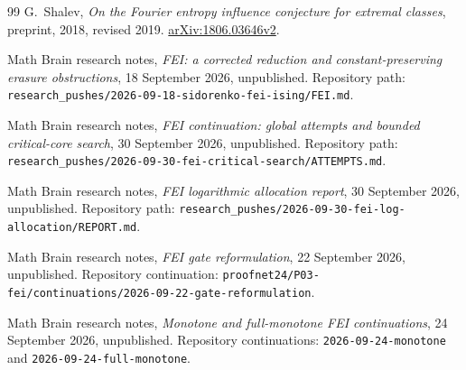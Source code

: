 \begin{thebibliography}{99}
G.~Shalev,
\emph{On the Fourier entropy influence conjecture for extremal classes},
preprint, 2018, revised 2019.
\href{https://arxiv.org/abs/1806.03646v2}{arXiv:1806.03646v2}.

Math Brain research notes,
\emph{FEI: a corrected reduction and constant-preserving erasure obstructions},
18 September 2026, unpublished.
Repository path: \texttt{research\_pushes/2026-09-18-sidorenko-fei-ising/FEI.md}.

Math Brain research notes,
\emph{FEI continuation: global attempts and bounded critical-core search},
30 September 2026, unpublished.
Repository path: \texttt{research\_pushes/2026-09-30-fei-critical-search/ATTEMPTS.md}.

Math Brain research notes,
\emph{FEI logarithmic allocation report}, 30 September 2026, unpublished.
Repository path: \texttt{research\_pushes/2026-09-30-fei-log-allocation/REPORT.md}.

Math Brain research notes,
\emph{FEI gate reformulation}, 22 September 2026, unpublished.
Repository continuation: \texttt{proofnet24/P03-fei/continuations/2026-09-22-gate-reformulation}.

Math Brain research notes,
\emph{Monotone and full-monotone FEI continuations},
24 September 2026, unpublished.
Repository continuations: \texttt{2026-09-24-monotone} and \texttt{2026-09-24-full-monotone}.
\end{thebibliography}
